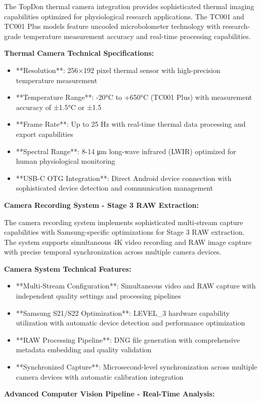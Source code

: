 \documentclass[12pt,a4paper]{report}
\begin{document}
The TopDon thermal camera integration provides sophisticated thermal imaging capabilities optimized for physiological
research applications. The TC001 and TC001 Plus models feature uncooled microbolometer technology with research-grade
temperature measurement accuracy and real-time processing capabilities.

\textbf{Thermal Camera Technical Specifications:}

\begin{itemize}
\item **Resolution**: 256×192 pixel thermal sensor with high-precision temperature measurement
\item **Temperature Range**: -20°C to +650°C (TC001 Plus) with measurement accuracy of ±1.5°C or ±1.5%
\item **Frame Rate**: Up to 25 Hz with real-time thermal data processing and export capabilities
\item **Spectral Range**: 8-14 μm long-wave infrared (LWIR) optimized for human physiological monitoring
\item **USB-C OTG Integration**: Direct Android device connection with sophisticated device detection and communication
  management

\end{itemize}
\textbf{Camera Recording System - Stage 3 RAW Extraction:}

The camera recording system implements sophisticated multi-stream capture capabilities with Samsung-specific
optimizations for Stage 3 RAW extraction. The system supports simultaneous 4K video recording and RAW image capture with
precise temporal synchronization across multiple camera devices.

\textbf{Camera System Technical Features:}

\begin{itemize}
\item **Multi-Stream Configuration**: Simultaneous video and RAW capture with independent quality settings and processing
  pipelines
\item **Samsung S21/S22 Optimization**: LEVEL_3 hardware capability utilization with automatic device detection and
  performance optimization
\item **RAW Processing Pipeline**: DNG file generation with comprehensive metadata embedding and quality validation
\item **Synchronized Capture**: Microsecond-level synchronization across multiple camera devices with automatic calibration
  integration

\end{itemize}
\textbf{Advanced Computer Vision Pipeline - Real-Time Analysis:}
\end{document}
